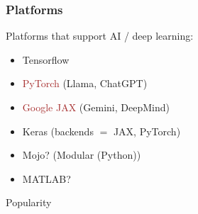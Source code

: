 \documentclass[
    xcolor={svgnames,dvipsnames},
    hyperref={colorlinks, citecolor=DeepPink4, linkcolor=DarkRed, urlcolor=DarkBlue}
    ]{beamer}  %
\newcommand{\brown}[1]{\textcolor{Brown}{\sf #1}}
\newcommand{\1}{\mathbbm 1}
\begin{document}
\begin{frame}
    \frametitle{Platforms}
    
    Platforms that support AI / deep learning:

    \vspace{0.5em}
    \begin{itemize}
        \item Tensorflow
        \vspace{0.5em}
        \item \brown{PyTorch} (Llama, ChatGPT)
        \vspace{0.5em}
        \item \brown{Google JAX} (Gemini, DeepMind)
        \vspace{0.5em}
        \item Keras (backends $=$ JAX, PyTorch)
        \vspace{0.5em}
        \item Mojo? (Modular (Python))
        \vspace{0.5em}
        \item MATLAB? 
    \end{itemize}

\end{frame}




\begin{frame}
    
    Popularity

    
    \begin{figure}
       \begin{center}
       \end{center}
    \end{figure}


\end{frame}
\end{document}

